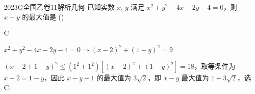 
\begin{problem}{2023}{G}{全国乙卷}{11}{解析几何}
已知实数 $ x $, $ y $ 满足 $ x^2 + y^2 - 4x - 2y - 4 = 0 $，则 $ x - y $ 的最大值是 (\hspace{1cm})
\begin{choices}
\end{choices}
\end{problem}

\begin{answer}
C
\end{answer}

\begin{solutions}
$x^2 + y^2 - 4x - 2y - 4 = 0 \Rightarrow (x - 2)^2 + (1 - y)^2 = 9$

$(x - 2 + 1 - y)^2 \leq (1^2 + 1^2)\left[(x - 2)^2 + (1 - y)^2\right] = 18$，取等条件为 $ x - 2 = 1 - y $，因此 $ x - y - 1 $ 的最大值为 $ 3\sqrt{2} $，即 $ x - y $ 最大值为 $ 1 + 3\sqrt{2} $，选 C.
\end{solutions}